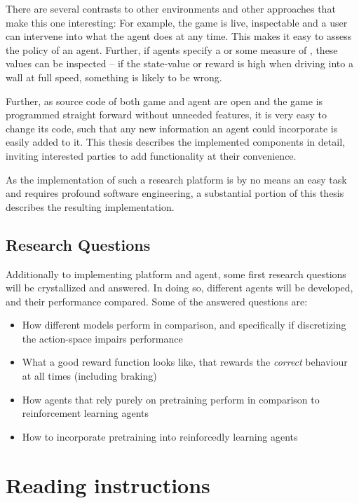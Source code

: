 There are several contrasts to other environments and other approaches that make this one interesting: For example, the game is live, inspectable and a user can intervene into what the agent does at any time. This makes it easy to assess the policy of an agent. Further, if agents specify a  or some measure of , these values can be inspected -- if the state-value or reward is high when driving into a wall at full speed, something is likely to be wrong.

Further, as source code of both game and agent are open and the game is programmed straight forward without unneeded features, it is very easy to change its code, such that any new information an agent could incorporate is easily added to it. This thesis describes the implemented components in detail, inviting interested parties to add functionality at their convenience.

As the implementation of such a research platform is by no means an easy task and requires profound software engineering, a substantial portion of this thesis describes the resulting implementation.

\subsection{Research Questions}

\label{sec:researchquestions}

Additionally to implementing platform and agent, some first research questions will be crystallized and answered. In doing so, different agents will be developed, and their performance compared. Some of the answered questions are:
\begin{itemize}
	\item How different models perform in comparison, and specifically if discretizing the action-space impairs performance
	\item What a good reward function looks like, that rewards the \textit{correct} behaviour at all times (including braking)
	\item How agents that rely purely on pretraining perform in comparison to reinforcement learning agents
	\item How to incorporate pretraining into reinforcedly learning agents
\end{itemize}

\section{Reading instructions}

